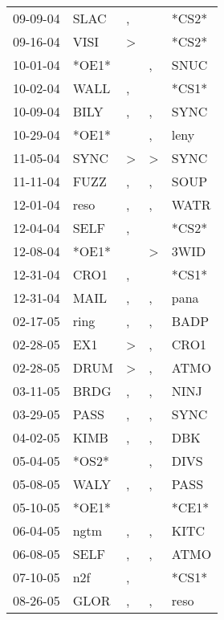 \begin{supertabular}{lllll}
 09-09-04 &   SLAC &             , &               &  *CS2* \\
 09-16-04 &   VISI &  \textgreater &               &  *CS2* \\
 10-01-04 &  *OE1* &               &             , &   SNUC \\
 10-02-04 &   WALL &             , &               &  *CS1* \\
 10-09-04 &   BILY &             , &             , &   SYNC \\
 10-29-04 &  *OE1* &               &             , &   leny \\
 11-05-04 &   SYNC &  \textgreater &  \textgreater &   SYNC \\
 11-11-04 &   FUZZ &             , &             , &   SOUP \\
 12-01-04 &   reso &             , &             , &   WATR \\
 12-04-04 &   SELF &             , &               &  *CS2* \\
 12-08-04 &  *OE1* &               &  \textgreater &   3WID \\
 12-31-04 &   CRO1 &             , &               &  *CS1* \\
 12-31-04 &   MAIL &             , &             , &   pana \\
 02-17-05 &   ring &             , &             , &   BADP \\
 02-28-05 &    EX1 &  \textgreater &             , &   CRO1 \\
 02-28-05 &   DRUM &  \textgreater &             , &   ATMO \\
 03-11-05 &   BRDG &             , &             , &   NINJ \\
 03-29-05 &   PASS &             , &             , &   SYNC \\
 04-02-05 &   KIMB &             , &             , &    DBK \\
 05-04-05 &  *OS2* &               &             , &   DIVS \\
 05-08-05 &   WALY &             , &             , &   PASS \\
 05-10-05 &  *OE1* &               &               &  *CE1* \\
 06-04-05 &   ngtm &             , &             , &   KITC \\
 06-08-05 &   SELF &             , &             , &   ATMO \\
 07-10-05 &    n2f &             , &               &  *CS1* \\
 08-26-05 &   GLOR &             , &             , &   reso \\

\end{supertabular}
